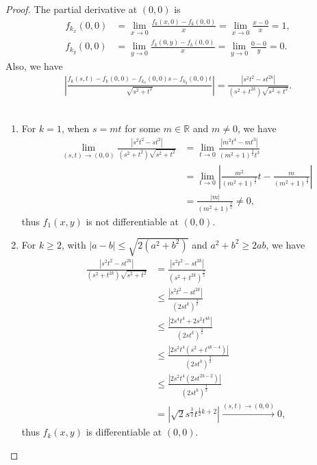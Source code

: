 \documentclass[11pt]{article}
\theoremstyle{definition}
\numberwithin{equation}{subsection}
\begin{document}
\begin{proof}
The partial derivative at $(0,0)$ is 
\begin{align*}
    f_{k_x}(0,0) & = \lim_{x \to 0} \frac{f_k(x,0) - f_k(0,0)}{x} = \lim_{x \to 0}\frac{x - 0}{x} = 1, \\
    f_{k_y}(0,0) & = \lim_{y \to 0} \frac{f_k(0,y) - f_k(0,0)}{x} = \lim_{y \to 0}\frac{0 - 0}{y} =  0.
\end{align*}
Also, we have
\begin{align*}
    \left| \frac{f_k(s,t) - f_k(0,0) - f_{k_x}(0,0)s - f_{k_y}(0,0)t}{\sqrt{s^2 + t^2}} \right| = \frac{\left|s^2t^2 - st^{2k}\right|}{(s^2 + t^{2k}) \sqrt{s^2 + t^2}}.
\end{align*}
~\begin{enumerate}[label=(\alph*)]
    \item For $k = 1$, when $s = mt$ for some $m \in \mathbb{R}$ and $m \neq 0$, we have
    \begin{align*}
        \lim_{(s,t)\to (0,0)} \frac{\left|s^2t^2 - st^2\right|}{(s^2 + t^2) \sqrt{s^2 + t^2}} & = \lim_{t\to 0} \frac{\left|m^2t^4 - mt^3\right|}{(m^2 + 1)^{\frac{3}{2}} t^3} \\
        & = \lim_{t\to 0} \left| \frac{m^2}{(m^2 + 1)^{\frac{3}{2}}} t - \frac{m}{(m^2 + 1)^{\frac{3}{2}}} \right| \\
        & = \frac{|m|}{(m^2 + 1)^{\frac{3}{2}}} \neq 0,
    \end{align*}
    thus $f_1(x,y)$ is not differentiable at $(0,0)$.
    
    \item For $k \geq 2$, with $|a - b| \leq \sqrt{2(a^2 + b^2)}$ and $a^2 + b^2 \geq 2ab$, we have
    \begin{align*}
        \frac{\left|s^2t^2 - st^{2k}\right|}{(s^2 + t^{2k}) \sqrt{s^2 + t^2}} & = \frac{\left|s^2t^2 - st^{2k}\right|}{(s^2 + t^{2k})^{\frac{3}{2}}} \\
        & \leq \frac{\left|s^2t^2 - st^{2k}\right|}{ (2st^k)^{\frac{3}{2}}} \\
        & \leq \frac{\left|2s^4t^4 + 2s^2t^{4k}\right| }{(2st^k)^{\frac{3}{2}}}\\
        & \leq \frac{\left|2s^2t^4 \left( s^2 + t^{4k-4} \right) \right|}{(2st^k)^{\frac{3}{2}}} \\
        & \leq \frac{\left|2s^2t^4 \left( 2st^{2k-2} \right) \right|}{(2st^k)^{\frac{3}{2}}} \\
        & = \left| \sqrt{2} s^{\frac{3}{2}} t^{\frac{1}{2}k+2} \right| \xrightarrow[]{(s,t)\to(0,0)} 0,
    \end{align*}
    thus $f_k(x,y)$ is differentiable at $(0,0)$.
\end{enumerate}
\end{proof}
\end{document}
